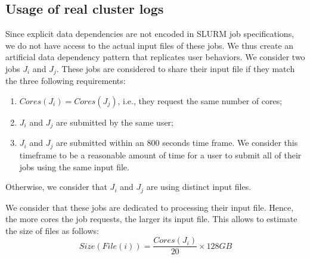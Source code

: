 \documentclass[sigconf,review,anonymous]{acmart}
\newcommand{\rev}[1]{{\color{blue}{#1}}}
\newcommand{\file}{\ensuremath{\mathit{File}}\xspace}
\newcommand{\size}{\ensuremath{\mathit{Size}}\xspace}
\newcommand{\core}{\mathit{Cores}\xspace}
\begin{document}
\subsection{Usage of real cluster logs}
\label{sec.working}
\rev{The logs we use contain historical data on jobs, namely their
 exact submission time, their requested walltime, their actual duration, the number of cores they required and the corresponding user's name. 
}
%
Since explicit data dependencies are not encoded in SLURM job
specifications, we do not have access to the actual input files of
these jobs. We thus create an artificial data dependency pattern that
replicates user behaviors.
\rev{Each job uses exactly one input file.}
We consider two jobs $J_i$ and $J_j$. These jobs are considered to
share their input file if they match the three following requirements:
\begin{enumerate}
	\item $\core(J_i) = \core(J_j)$, i.e., they request the same number of cores;
	\item $J_i$ and $J_j$ are submitted by the same user;
	\item $J_i$ and $J_j$ are submitted within an 800 seconds
          time frame. We consider this timeframe to be a reasonable amount of time for a user to submit all of their jobs using the same input file.
\end{enumerate}
Otherwise, we consider that $J_i$ and $J_j$ are using distinct input files. 
\rev{
In theory, two users could share the same file. 
However, because they are using subsets of different databases, it is very unlikely that two
users would work on the same project using the same databases, therefore we ignore this possibility.
}

We consider that these jobs are dedicated to processing their input
file. Hence, the more cores the job requests, 
the larger its input file. This allows to estimate the size of files as follows:
$$\size(\file(i)) =\frac{\core(J_i)}{20} \times 128GB$$
\rev{
For example, if a user need 128GB of memory but would only request 1 of the 20 available cores, that user would block the node for all other users.
Consequently, it is more efficient for a user who need the whole memory of a node to reserve all its cores. 
}
\end{document}

